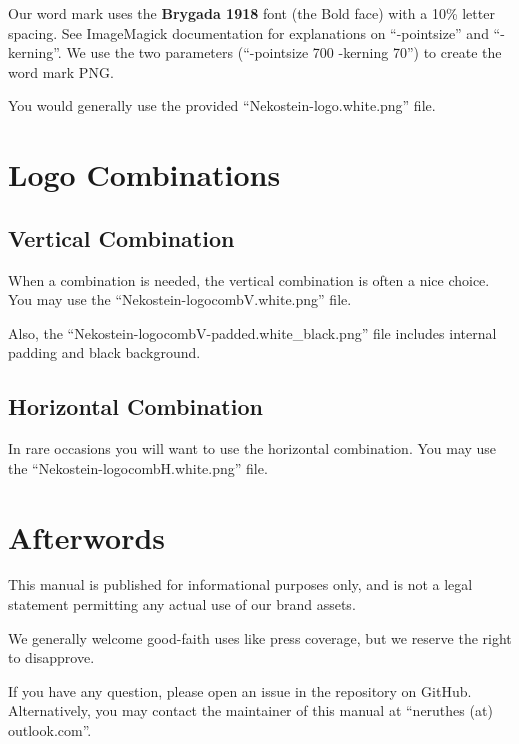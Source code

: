 \documentclass[a4paper,11pt]{article}
\begin{document}
Our word mark uses the \textbf{Brygada 1918} font (the Bold face) with a 10\% letter spacing.
See ImageMagick documentation for explanations on ``-pointsize'' and ``-kerning''.
We use the two parameters (``-pointsize 700 -kerning 70'') to create the word mark PNG.

You would generally use the provided ``Nekostein-logo.white.png'' file.





\section{Logo Combinations}

\subsection{Vertical Combination}

When a combination is needed, the vertical combination is often a nice choice.
You may use the ``Nekostein-logocombV.white.png'' file.

Also, the ``Nekostein-logocombV-padded.white\_black.png'' file includes internal padding and black background.

\subsection{Horizontal Combination}

In rare occasions you will want to use the horizontal combination.
You may use the ``Nekostein-logocombH.white.png'' file.








\section*{Afterwords}
This manual is published for informational purposes only,
and is not a legal statement permitting any actual use of our brand assets.

We generally welcome good-faith uses like press coverage,
but we reserve the right to disapprove.

If you have any question, please open an issue in the repository on GitHub.
Alternatively, you may contact the maintainer of this manual at ``neruthes (at) outlook.com''.
\end{document}
